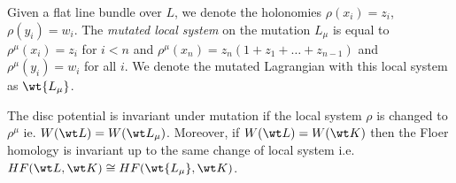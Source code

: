 Given a flat line bundle over $L$, we denote the holonomies $\rho(x_i)=z_i$, $\rho(y_i)=w_i$. The  \textit{mutated local system} on the mutation $L_\mu$ is equal to $\rho^\mu(x_i)=z_i$ for $i<n$ and $\rho^\mu(x_n)=z_n(1+z_1 + \dots + z_{n-1})$  and $\rho^\mu(y_i)=w_i$ for all $i$. We denote the mutated Lagrangian with this local system as $\wt{ L_{\mu}}$.


\begin{Theorem}[Mutation]\label{premain}
The disc potential is invariant under mutation if the local system $\rho$  is changed to $\rho^\mu$ ie. $W(\wt L) = W(\wt L_\mu)$. Moreover, if $W(\wt L) = W(\wt K)$ then the Floer homology is invariant up to the same change of local system i.e. $HF(\wt L,\wt K) \cong HF(\wt{ L_{\mu}},\wt K)$.
\end{Theorem}

